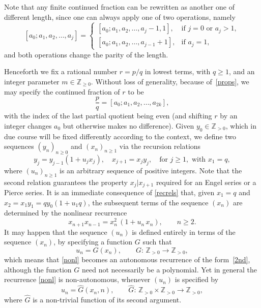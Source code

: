 \documentclass[10pt, a4paper]{amsart}
\numberwithin{equation}{section}
\theoremstyle{plain}
\theoremstyle{definition}
\newcommand{\Zo}{\mathbb{Z}_{\ge0}}
\newcommand{\Zp}{\mathbb{Z}_{>0}}
\begin{document}
Note that  any finite continued fraction can be rewritten as another one of 
different length, since   one can always apply one of two 
operations, namely 
\begin{equation}
\label{props} 
  [a_0;a_1,a_2,\dots,a_{j}] =
\begin{cases}
  [a_0;a_1,a_2,\dots,a_{j}-1,1], & \text{if $j=0$ or $a_j >1$},\\
  [a_0;a_1,a_2,\dots,a_{j-1}+1], & \text{if $a_j = 1$},
\end{cases}
\end{equation} 
and both operations change the parity of the length.

Henceforth we  fix a rational number $r=p/q$ in lowest terms, with $q \ge 1$, and an integer parameter $m\in\Zo$. 
Without loss of 
generality, because of~\eqref{props}, we may specify the continued fraction of $r$ to be 
\begin{equation}
\label{evencf} 
\frac{p}{q}=  [a_0;a_1,a_2,\dots,a_{2k}], 
\end{equation} 
with the index of the last partial quotient being even 
(and shifting $r$ by an integer changes $a_0$ but 
otherwise makes no difference). Given %
$y_0\in\Zp$, which 
in due course will be fixed differently  according to the context, we define two sequences 
$(y_n)_{n\geq 0}$ and $(x_n)_{n\geq 1}$ via the recursion relations 
\begin{equation}
\label{recrels} 
y_{j}=y_{j-1}(1+u_{j}x_{j}), \quad 
x_{j+1}= x_{j}y_j, \quad \text{for} \,\,j\geq 1, \, \, \text{with}\,\, x_1=q, 
\end{equation}  
where $(u_n)_{n\geq 1}$ is an arbitrary sequence of positive integers. Note that 
the second relation guarantees the property $x_j|x_{j+1}$ required 
for an Engel series or a Pierce series. It is an 
immediate consequence of \eqref{recrels} that, given $x_1=q$ and 
$x_2=x_1y_1=qy_0(1+u_1q)$, the subsequent terms of the 
sequence $(x_n)$ are determined by the nonlinear recurrence 
\begin{equation}
\label{nonl} 
x_{n+1}x_{n-1} = x_n^2 \,(1+u_n\, x_n), \qquad n\geq 2. 
\end{equation}  
It may happen that the sequence $(u_n)$ is defined entirely in terms of 
the sequence $(x_n)$, by specifying a function $G$ such that 
\begin{equation}
\label{aut} 
u_n = G(x_n), \qquad G: \, \Zp\rightarrow\Zp, 
\end{equation} 
which means that \eqref{nonl} becomes an autonomous recurrence of the 
form~\eqref{2nd}, although the function $G$ need not necessarily be a polynomial. 
Yet in general the recurrence \eqref{nonl} is non-autonomous, whenever %
$(u_n)$ is specified by 
\begin{equation}
\label{naut} 
u_n = \widehat{G}(x_n,n), \qquad \widehat{G}: \, \Zp\times\Zp\rightarrow\Zp, 
\end{equation} 
where $\widehat{G}$ is a non-trivial function of its second argument. 
\end{document}
